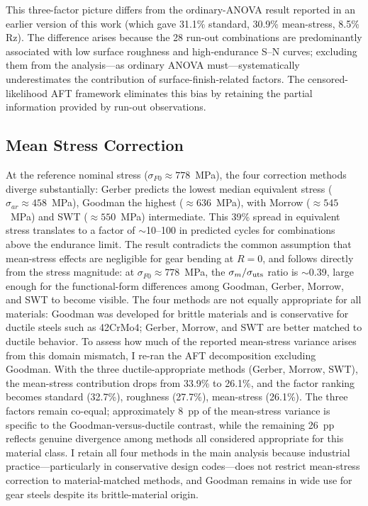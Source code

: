 \documentclass[12pt,a4paper]{article}
\begin{document}
This three-factor picture differs from the ordinary-ANOVA result
reported in an earlier version of this work (which gave 31.1\%
standard, 30.9\% mean-stress, 8.5\% Rz). The difference arises
because the 28 run-out combinations are predominantly associated
with low surface roughness and high-endurance S--N curves; excluding
them from the analysis---as ordinary ANOVA must---systematically
underestimates the contribution of surface-finish-related factors.
The censored-likelihood AFT framework eliminates this bias by
retaining the partial information provided by run-out observations.

\subsection{Mean Stress Correction}

At the reference nominal stress ($\sigma_{F0} \approx 778$~MPa), the
four correction methods diverge substantially: Gerber predicts the
lowest median equivalent stress ($\sigma_{ar} \approx 458$~MPa),
Goodman the highest ($\approx 636$~MPa), with Morrow ($\approx 545$~MPa)
and SWT ($\approx 550$~MPa) intermediate. This 39\% spread in
equivalent stress translates to a factor of $\sim$10--100 in predicted
cycles for combinations above the endurance limit. The result contradicts
the common assumption that mean-stress effects are negligible for gear
bending at $R=0$, and follows directly from the stress magnitude: at
$\sigma_{F0} \approx 778$~MPa, the $\sigma_m/\sigma_{\rm uts}$ ratio
is $\sim$0.39, large enough for the functional-form differences among
Goodman, Gerber, Morrow, and SWT to become visible.
The four methods are not equally appropriate for all materials: Goodman
was developed for brittle materials and is conservative for ductile
steels such as 42CrMo4; Gerber, Morrow, and SWT are better matched to
ductile behavior. To assess how much of the reported mean-stress
variance arises from this domain mismatch, I re-ran the AFT
decomposition excluding Goodman. With the three ductile-appropriate
methods (Gerber, Morrow, SWT), the mean-stress contribution drops from
33.9\% to 26.1\%, and the factor ranking becomes standard (32.7\%),
roughness (27.7\%), mean-stress (26.1\%). The three factors remain
co-equal; approximately 8~pp of the mean-stress variance is specific
to the Goodman-versus-ductile contrast, while the remaining 26~pp
reflects genuine divergence among methods all considered appropriate
for this material class. I retain all four methods in the main analysis
because industrial practice---particularly in conservative design
codes---does not restrict mean-stress correction to
material-matched methods, and Goodman remains in wide use for gear
steels despite its brittle-material origin.
\end{document}
